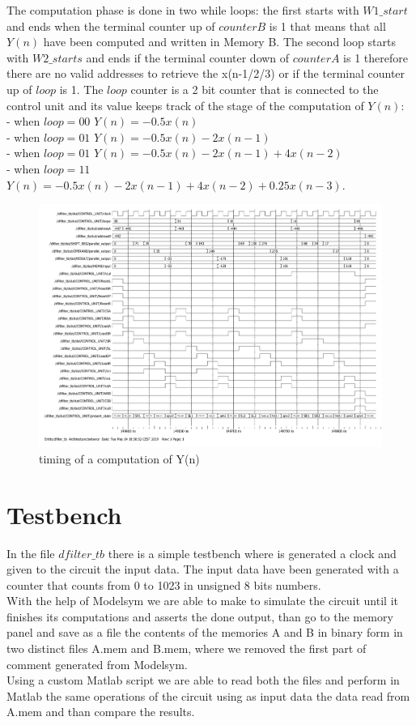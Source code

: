 \documentclass[12pt]{article}
\begin{document}
The computation phase is done in two while loops: the first starts with $W1\_start$ and ends when the terminal counter up of $counterB$ is 1 that means that all $Y(n)$ have been computed and written in Memory B. The second loop starts with $W2\_starts$ and ends if the terminal counter down of $counterA$ is 1 therefore there are no valid addresses to retrieve the x(n-1/2/3) or if the terminal counter up of $loop$ is 1. The $loop$ counter is a 2 bit counter that is connected to the control unit and its value keeps track of the stage of the computation of $Y(n)$:\\
- when $loop=00$ $Y(n)=-0.5x(n)$ \\
- when $loop=01$ $Y(n)=-0.5x(n)-2x(n-1)$\\
- when $loop=01$ $Y(n)=-0.5x(n)-2x(n-1)+4x(n-2)$\\
- when $loop=11$ $Y(n)=-0.5x(n)-2x(n-1)+4x(n-2)+0.25x(n-3)$.\\

\begin{figure}[h]
	
	\includegraphics[scale = 0.5]{immagini/timing2.pdf}
	\caption{timing of a computation of Y(n)}
\end{figure}


\newpage
\section*{Testbench}
In the file $dfilter\_tb$ there is a simple testbench where is generated a clock and given to the circuit the input data. The input data have been generated with a counter that counts from 0 to 1023 in unsigned 8 bits numbers. \\
With the help of Modelsym we are able to make to simulate the circuit until it finishes its computations and asserts the done output, than go to the memory panel and save as a file the contents of the memories A and B in binary form in two distinct files A.mem and B.mem, where we removed the first part of comment generated from Modelsym. \\
Using a custom Matlab script we are able to read both the files and perform in Matlab the same operations of the circuit using as input data the data read from A.mem and than compare the results. 
\end{document}

